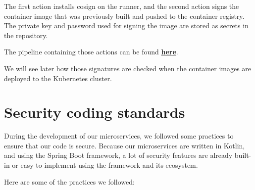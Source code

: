 \documentclass[12pt,x11names]{article}
\begin{document}
The first action installs cosign on the runner, and the second action signs the container
image that was previously built and pushed to the container registry. The private key and
password used for signing the image are stored as secrets in the repository.

\medskip
The pipeline containing those actions can be found \href{https://github.com/thomas-mauran/LinkedOut/blob/main/.github/workflows/flow_backend_build_push.yml}{\textbf{here}}.

\medskip
We will see later how those signatures are checked when the container images are deployed
to the Kubernetes cluster.

\section{Security coding standards}

During the development of our microservices, we followed some practices to ensure that
our code is secure. Because our microservices are written in Kotlin, and using the
Spring Boot framework, a lot of security features are already built-in or easy to
implement using the framework and its ecosystem.

\medskip
Here are some of the practices we followed:
\end{document}

